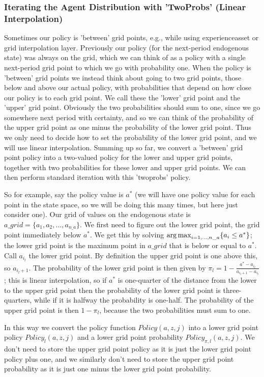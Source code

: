 \subsubsection{Iterating the Agent Distribution with 'TwoProbs' (Linear Interpolation)}
Sometimes our policy is 'between' grid points, e.g., while using experienceasset or grid interpolation layer. Previously our policy (for the next-period endogenous state) was always on the grid, which we can think of as a policy with a single next-period grid point to which we go with probability one. When the policy is 'between' grid points we instead think about going to two grid points, those below and above our actual policy, with probabilities that depend on how close our policy is to each grid point. We call these the 'lower' grid point and the 'upper' grid point. Obviously the two probabilities should sum to one, since we go somewhere next period with certainty, and so we can think of the probability of the upper grid point as one minus the probability of the lower grid point. Thus we only need to decide how to set the probability of the lower grid point, and we will use linear interpolation. Summing up so far, we convert a 'between' grid point policy into a two-valued policy for the lower and upper grid points, together with two probabilities for these lower and upper grid points. We can then perform standard iteration with this 'twoprobs' policy.

So for example, say the policy value is $a^*$ (we will have one policy value for each point in the state space, so we will be doing this many times, but here just consider one). Our grid of values on the endogenous state is $a\_{}grid=\{a_1,a_2,\dots, a_{n\_{}a}\}$. We first need to figure out the lower grid point, the grid point immediately below $a^*$. We get this by solving $\operatorname*{arg\,max}_{i=1,\dots,n\_{}a} \{a_i\leq a^*\}$; the lower grid point is the maximum point in $a\_{}grid$ that is below or equal to $a^*$. Call $a_{i_l}$ the lower grid point. By definition the upper grid point is one above this, so $a_{i_l+1}$. The probability of the lower grid point is then given by $\pi_{l}=1-\frac{a^*-a_{i_l}}{a_{i_l+1}-a_{i_l}}$; this is linear interpolation, so if $a^*$ is one-quarter of the distance from the lower to the upper grid point then the probability of the lower grid point is three-quarters, while if it is halfway the probability is one-half. The probability of the upper grid point is then $1-\pi_{l}$, because the two probabilities must sum to one.

In this way we convert the policy function $Policy(a,z,j)$ into a lower grid point policy $Policy_{l}(a,z,j)$ and a lower grid point probability $Policy_{\pi,l}(a,z,j)$. We don't need to store the upper grid point policy as it is just the lower grid point policy plus one, and we similarly don't need to store the upper grid point probability as it is just one minus the lower grid point probability.

